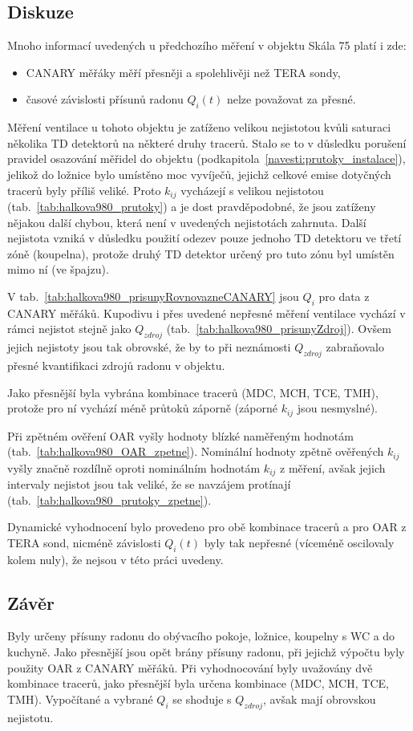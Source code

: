 \subsection{Diskuze}
Mnoho informací uvedených u předchozího měření v objektu Skála 75 platí i zde:
\begin{itemize}
    \item CANARY měřáky měří přesněji a spolehlivěji než TERA sondy,
    \item časové závislosti přísunů radonu $Q_i(t)$ nelze považovat za přesné.
\end{itemize}

Měření ventilace u tohoto objektu je zatíženo velikou nejistotou kvůli saturaci několika TD detektorů na některé druhy tracerů. Stalo se to v důsledku porušení pravidel osazování měřidel do objektu (podkapitola~\ref{navesti:prutoky_instalace}), jelikož do ložnice bylo umístěno moc vyvíječů, jejichž celkové emise dotyčných tracerů byly příliš veliké. Proto $k_{ij}$ vycházejí s velikou nejistotou (tab.~\ref{tab:halkova980_prutoky}) a je dost pravděpodobné, že jsou zatíženy nějakou další chybou, která není v uvedených nejistotách zahrnuta. Další nejistota vzniká v důsledku použití odezev pouze jednoho TD detektoru ve třetí zóně (koupelna), protože druhý TD detektor určený pro tuto zónu byl umístěn mimo ní (ve špajzu).

V tab.~\ref{tab:halkova980_prisunyRovnovazneCANARY} jsou $Q_i$ pro data z CANARY měřáků. Kupodivu i přes uvedené nepřesné měření ventilace vychází v rámci nejistot stejně jako $Q_{zdroj}$ (tab.~\ref{tab:halkova980_prisunyZdroj}). Ovšem jejich nejistoty jsou tak obrovské, že by to při neznámosti $Q_{zdroj}$ zabraňovalo přesné kvantifikaci zdrojů radonu v objektu.

Jako přesnější byla vybrána kombinace tracerů (MDC, MCH, TCE, TMH), protože pro ní vychází méně průtoků záporně (záporné $k_{ij}$ jsou nesmyslné).

Při zpětném ověření OAR vyšly hodnoty blízké naměřeným hodnotám (tab.~\ref{tab:halkova980_OAR_zpetne}). Nominální hodnoty zpětně ověřených $k_{ij}$ vyšly značně rozdílně oproti nominálním hodnotám $k_{ij}$ z měření, avšak jejich intervaly nejistot jsou tak veliké, že se navzájem protínají (tab.~\ref{tab:halkova980_prutoky_zpetne}). 

Dynamické vyhodnocení bylo provedeno pro obě kombinace tracerů a pro OAR z TERA sond, nicméně závislosti $Q_i(t)$ byly tak nepřesné (víceméně oscilovaly kolem nuly), že nejsou v této práci uvedeny.
\subsection{Závěr}
Byly určeny přísuny radonu do obývacího pokoje, ložnice, koupelny s WC a do kuchyně. Jako přesnější jsou opět brány přísuny radonu, při jejichž výpočtu byly použity OAR z CANARY měřáků. Při vyhodnocování byly uvažovány dvě kombinace tracerů, jako přesnější byla určena kombinace (MDC, MCH, TCE, TMH). Vypočítané a vybrané $Q_i$ se shoduje s $Q_{zdroj}$, avšak mají obrovskou nejistotu.

